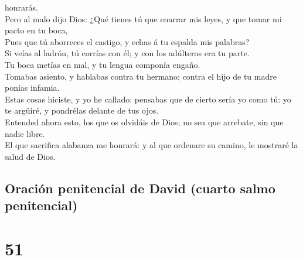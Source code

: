 honrarás.\\
 Pero al malo dijo Dios: ¿Qué tienes tú que enarrar mis
leyes, y que tomar mi pacto en tu boca,\\
 Pues que tú aborreces el castigo, y echas á tu espalda mis
palabras?\\
 Si veías al ladrón, tú corrías con él; y con los adúlteros
era tu parte.\\
 Tu boca metías en mal, y tu lengua componía engaño.\\
 Tomabas asiento, y hablabas contra tu hermano; contra el
hijo de tu madre ponías infamia.\\
 Estas cosas hiciste, y yo he callado: pensabas que de
cierto sería yo como tú: yo te argüiré, y pondrélas delante de tus
ojos.\\
 Entended ahora esto, los que os olvidáis de Dios; no sea
que arrebate, sin que nadie libre.\\
 El que sacrifica alabanza me honrará: y al que ordenare su
camino, le mostraré la salud de Dios.

\hypertarget{oraciuxf3n-penitencial-de-david-cuarto-salmo-penitencial}{%
\subsection{Oración penitencial de David (cuarto salmo
penitencial)}\label{oraciuxf3n-penitencial-de-david-cuarto-salmo-penitencial}}

\hypertarget{section-50}{%
\section{51}\label{section-50}}

